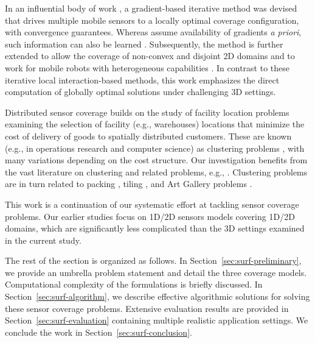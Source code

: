 In an influential body of work \cite{cortes2004coverage,martinez2007motion}, 
a gradient-based iterative method was devised that drives multiple mobile sensors to a locally optimal coverage configuration, with 
convergence guarantees. 
%
Whereas \cite{cortes2004coverage,martinez2007motion} assume availability of gradients {\em a priori}, 
such information can also be learned \cite{schwager2009decentralized}. 
%
Subsequently, the method is further extended to allow the coverage of non-convex and disjoint 2D domains \cite{schwager2009optimal} 
and to work for mobile robots with heterogeneous capabilities \cite{pierson2017adapting}. 
%
In contrast to these iterative local interaction-based methods, 
this work emphasizes the direct computation of globally optimal solutions under challenging 3D settings. 

Distributed sensor coverage \cite{cortes2004coverage,schwager2009decentralized} builds on the study of 
facility location problems \cite{weber1929theory,drezner1995facility} examining the selection of facility (e.g., warehouses) locations 
that minimize the cost of delivery of goods to spatially distributed customers. 
These are known (e.g., in operations research and computer science) as clustering problems \cite{har2011geometric}, 
with many variations depending on the cost structure. Our investigation benefits from the vast literature on clustering and related problems, 
e.g., \cite{feder1988optimal,hochbaum1985best,gonzalez1985clustering,daskin2000new,shamos1975closest}.
%
Clustering problems are in turn related to packing \cite{hales2005proof}, tiling \cite{thue1910dichteste}, 
and Art Gallery problems \cite{o1987art,shermer1992recent}.

This work is a continuation of our systematic effort \cite{fenghangaoyu2019efficient,fengyu2020RAL,fengyu2020optimally} at tackling sensor coverage problems. 
Our earlier studies focus on 1D/2D sensors models covering 1D/2D domains, which are significantly less complicated than the 3D settings examined in the current study.

The rest of the section is organized as follows. In Section~\ref{sec:surf-preliminary}, we provide an umbrella problem statement and detail the three coverage models. 
Computational complexity of the formulations is briefly discussed. In Section~\ref{sec:surf-algorithm}, we describe effective algorithmic solutions for solving these sensor coverage problems. 
Extensive evaluation results are provided in Section~\ref{sec:surf-evaluation} containing multiple realistic application settings. We conclude the work in Section~\ref{sec:surf-conclusion}.